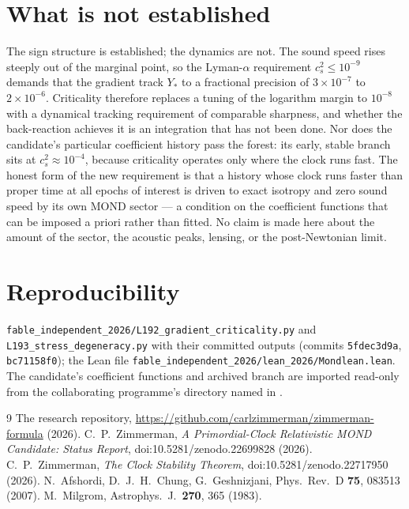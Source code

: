 \documentclass[11pt,letterpaper]{article}
\begin{document}
\section{What is not established}
The sign structure is established; the dynamics are not. The sound speed rises steeply out of the marginal point, so the Lyman-$\alpha$ requirement $c_s^2\le10^{-9}$ demands that the gradient track $Y_*$ to a fractional precision of $3\times10^{-7}$ to $2\times10^{-6}$. Criticality therefore replaces a tuning of the logarithm margin to $10^{-8}$ with a dynamical tracking requirement of comparable sharpness, and whether the back-reaction achieves it is an integration that has not been done. Nor does the candidate's particular coefficient history pass the forest: its early, stable branch sits at $c_s^2\approx10^{-4}$, because criticality operates only where the clock runs fast. The honest form of the new requirement is that a history whose clock runs faster than proper time at all epochs of interest is driven to exact isotropy and zero sound speed by its own MOND sector --- a condition on the coefficient functions that can be imposed a priori rather than fitted. No claim is made here about the amount of the sector, the acoustic peaks, lensing, or the post-Newtonian limit.

\section{Reproducibility}
\texttt{fable\_independent\_2026/L192\_gradient\_criticality.py} and \texttt{L193\_stress\_degeneracy.py} with their committed outputs (commits \texttt{5fdec3d9a}, \texttt{bc71158f0}); the Lean file \texttt{fable\_independent\_2026/lean\_2026/Mondlean.lean}. The candidate's coefficient functions and archived branch are imported read-only from the collaborating programme's directory named in \cite{paper13}.

\begin{thebibliography}{9}
 The research repository, \url{https://github.com/carlzimmerman/zimmerman-formula} (2026).
 C.~P.~Zimmerman, \emph{A Primordial-Clock Relativistic MOND Candidate: Status Report}, doi:10.5281/zenodo.22699828 (2026).
 C.~P.~Zimmerman, \emph{The Clock Stability Theorem}, doi:10.5281/zenodo.22717950 (2026).
 N.~Afshordi, D.~J.~H.~Chung, G.~Geshnizjani, Phys.\ Rev.\ D \textbf{75}, 083513 (2007).
 M.~Milgrom, Astrophys.\ J.\ \textbf{270}, 365 (1983).
\end{thebibliography}
\end{document}
